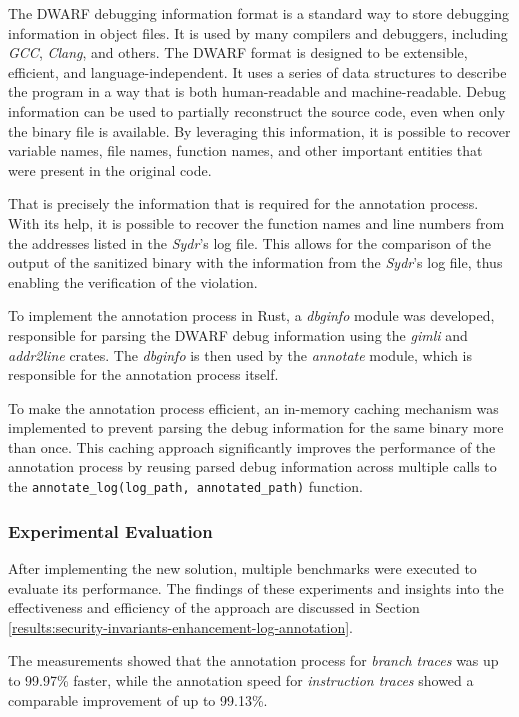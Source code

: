 The DWARF debugging information format is a standard way to store debugging information in object files. It is used by many compilers and debuggers, including \textit{GCC}, \textit{Clang}, and others. The DWARF format is designed to be extensible, efficient, and language-independent. It uses a series of data structures to describe the program in a way that is both human-readable and machine-readable. Debug information can be used to partially reconstruct the source code, even when only the binary file is available. By leveraging this information, it is possible to recover variable names, file names, function names, and other important entities that were present in the original code.

That is precisely the information that is required for the annotation process. With its help, it is possible to recover the function names and line numbers from the addresses listed in the \textit{Sydr}'s log file. This allows for the comparison of the output of the sanitized binary with the information from the \textit{Sydr}'s log file, thus enabling the verification of the violation.


To implement the annotation process in Rust, a \textit{dbginfo} module was developed, responsible for parsing the DWARF debug information using the \textit{gimli} and \textit{addr2line} crates. The \textit{dbginfo} is then used by the \textit{annotate} module, which is responsible for the annotation process itself.

To make the annotation process efficient, an in-memory caching mechanism was implemented to prevent parsing the debug information for the same binary more than once. This caching approach significantly improves the performance of the annotation process by reusing parsed debug information across multiple calls to the \texttt{annotate_log(log_path, annotated_path)} function.

\subsubsection{Experimental Evaluation}

After implementing the new solution, multiple benchmarks were executed to evaluate its performance. The findings of these experiments and insights into the effectiveness and efficiency of the approach are discussed in Section \ref{results:security-invariants-enhancement-log-annotation}.


The measurements showed that the annotation process for \textit{branch traces} was up to 99.97\% faster, while the annotation speed for \textit{instruction traces} showed a comparable improvement of up to 99.13\%.


